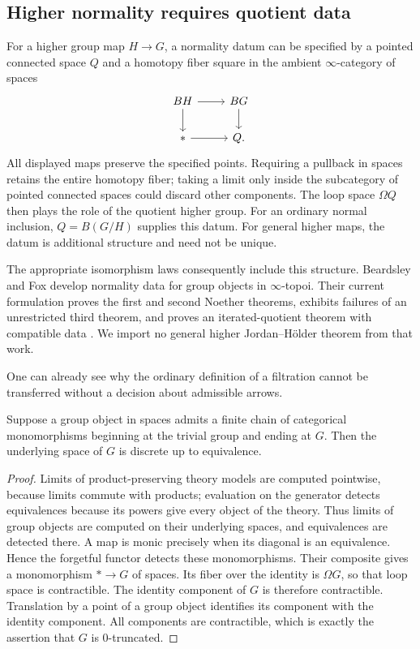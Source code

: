 \subsection{Higher normality requires quotient data}

For a higher group map $H\to G$, a normality datum can be specified by a
pointed connected space $Q$ and a homotopy fiber square in the ambient
$\infty$-category of spaces
\[
\begin{tikzcd}
 BH \arrow[r] \arrow[d] & BG \arrow[d]\\
 * \arrow[r] & Q.
\end{tikzcd}
\]
All displayed maps preserve the specified points. Requiring a pullback
in spaces retains the entire homotopy fiber; taking a limit only inside
the subcategory of pointed connected spaces could discard other components.
The loop space $\Omega Q$ then plays the role of the quotient higher
group.  For an ordinary normal inclusion, $Q=B(G/H)$ supplies this datum.
For general higher maps, the datum is additional structure and need not
be unique.

The appropriate isomorphism laws consequently include this structure.
Beardsley and Fox develop normality data for group objects in
$\infty$-topoi.  Their current formulation proves the first and second
Noether theorems, exhibits failures of an unrestricted third theorem,
and proves an iterated-quotient theorem with compatible data
\cite[\S5, especially Theorem 5.14]{BeardsleyFox}.  We import no general
higher Jordan--H\"older theorem from that work.

One can already see why the ordinary definition of a filtration cannot
be transferred without a decision about admissible arrows.

\begin{proposition}
\label{h:monos-discrete}
Suppose a group object in spaces admits a finite chain of categorical
monomorphisms beginning at the trivial group and ending at $G$.  Then
the underlying space of $G$ is discrete up to equivalence.
\end{proposition}
\begin{proof}
Limits of product-preserving theory models are computed pointwise,
because limits commute with products; evaluation on the generator
detects equivalences because its powers give every object of the theory.
Thus limits of group objects are computed on their underlying spaces,
and equivalences are detected there.  A map is monic precisely when its
diagonal is an equivalence.  Hence the forgetful functor detects these
monomorphisms.  Their composite gives a monomorphism $*\to G$ of spaces.
Its fiber over the identity is $\Omega G$, so that loop space is
contractible.  The identity component of $G$ is therefore contractible.
Translation by a point of a group object identifies its component with
the identity component.  All components are contractible, which is
exactly the assertion that $G$ is $0$-truncated.
\end{proof}

